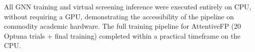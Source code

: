 \noindent
All GNN training and virtual screening inference were
executed entirely on CPU, without requiring a GPU,
demonstrating the accessibility of the pipeline on
commodity academic hardware. The full training pipeline
for AttentiveFP (20 Optuna trials + final training)
completed within a practical timeframe on the CPU.